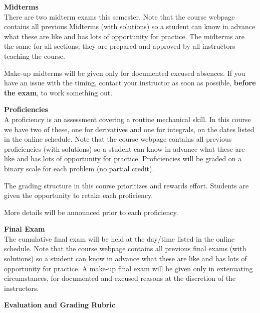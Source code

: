 \documentclass[12pt]{article}
\renewcommand{\emph}[1]{\textsf{\textbf{#1}}}
\newcommand{\localhead}[1]{\par\smallskip\textbf{#1}\nobreak\\}%
\def\heading#1{\localhead{\large\emph{#1}}}
\begin{document}
\heading{Midterms}
There are two midterm exams this semester. Note that the course webpage contains all previous Midterms (with solutions) so a student can know in advance what these are like and has lots of opportunity for practice. The midterms are the same 
for all sections; they are prepared and approved by all instructors teaching the course. 

Make-up midterms will be given only for documented excused absences. If you have an issue with the timing, contact your instructor as soon as possible, \emph{before the exam}, to work something out.

\heading{Proficiencies}
A proficiency is an assessment covering a routine mechanical skill.  In
this course we have two of these, one for derivatives and one for 
integrals, on the dates listed in the online schedule. Note that the course webpage contains all previous proficiencies (with solutions) so a student can know in advance what these are like and has lots of opportunity for practice.
Proficiencies will be graded on a binary scale for each problem
(no partial credit).  


The grading structure in this course prioritizes and rewards effort. Students are given the opportunity to retake each proficiency. 

More details will be announced prior to each proficiency.

\heading{Final Exam} 
The cumulative final exam will be held at the day/time listed in the
online schedule. Note that the course webpage contains all previous final exams (with solutions) so a student can know in advance what these are like  and has lots of opportunity for practice.
A make-up final exam will be given only in extenuating circumstances, for documented and excused reasons at the discretion of the instructors.

\heading{Evaluation and Grading Rubric}
\end{document}
